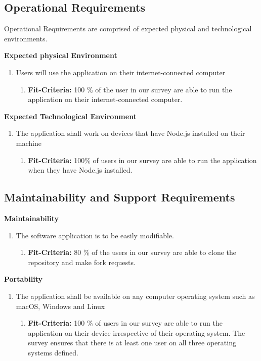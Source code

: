 \documentclass{article}
\begin{document}
\subsection{Operational Requirements}
Operational Requirements are comprised of expected physical and technological environments. \newline

\noindent
\textbf{Expected physical Environment }
\begin{enumerate}
\item Users will use the application on their internet-connected computer 
   \begin{enumerate}
    \item \textbf{Fit-Criteria:}  100 \% of the user in our survey are able to run the application on their internet-connected computer. 
    \end{enumerate}
\end{enumerate}

\noindent
\textbf{Expected Technological Environment }
\begin{enumerate}
\item The application shall work on devices that have Node.js installed on their machine 
   \begin{enumerate}
    \item \textbf{Fit-Criteria:}  100\% of users in our survey are able to run the application when they have Node.js installed. 
    \end{enumerate}

\end{enumerate}


\subsection{Maintainability and Support Requirements}
\textbf{Maintainability} 
\begin{enumerate}
\item The software application is to be easily modifiable.
   \begin{enumerate}
    \item \textbf{Fit-Criteria:}  80 \% of the users in our survey are able to clone the repository and make fork requests. 
    \end{enumerate}
\end{enumerate}

\noindent
\textbf{Portability} 
\begin{enumerate}
\item The application shall be available on any computer operating system such as macOS, Windows and Linux
   \begin{enumerate}
    \item \textbf{Fit-Criteria:}  100 \% of users in our survey are able to run the application on their device irrespective of their operating system. The survey ensures that there is at least one user on all three operating systems defined. 
    \end{enumerate}
\end{enumerate}
\end{document}
